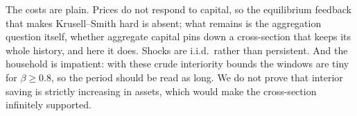\noindent
The costs are plain. Prices do not respond to capital, so the equilibrium feedback that makes
Krusell--Smith hard is absent; what remains is the aggregation question itself, whether aggregate
capital pins down a cross-section that keeps its whole history, and here it does. Shocks are
i.i.d.\ rather than persistent. And the household is impatient: with these crude interiority
bounds the windows are tiny for $\beta\ge 0.8$, so the period should be read as long. We do not
prove that interior saving is strictly increasing in assets, which would make the cross-section
infinitely supported.
